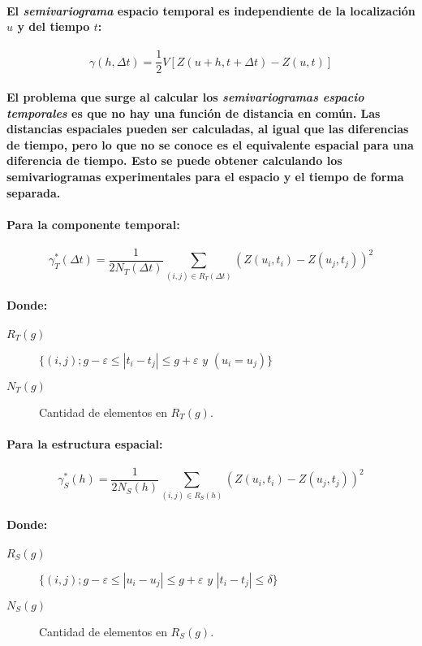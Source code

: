 \paragraph{
El \emph{semivariograma} espacio temporal es independiente de la localización $u$ y del tiempo $t$:
}
\begin{equation}
\gamma(h,\Delta t) = \frac{1}{2}V[Z(u+h,t+\Delta t) -Z(u,t)]
\end{equation}
\paragraph{
El problema que surge al calcular los \emph{semivariogramas espacio temporales} es que no hay una función de distancia en común. Las distancias espaciales pueden ser calculadas, al igual que las diferencias de tiempo, pero lo que no se conoce es el equivalente espacial para una diferencia de tiempo. Esto se puede obtener calculando los semivariogramas experimentales para el espacio y el tiempo de forma separada.
}
\paragraph{
Para la componente temporal:
}
\begin{equation}
\gamma_T^*(\Delta t) = \frac{1}{2 N_T(\Delta t)} \sum_{(i,j) \in R_T(\Delta t)} (Z(u_i,t_i)-Z(u_j,t_j))^2
\end{equation}
\paragraph{
Donde:
}
\begin{description}
\item[$R_T(g)$] $\{ (i,j); g - \varepsilon \leq |t_i - t_j| \leq g + \varepsilon \textit{ y } (u_i = u_j) \}$
\item[$N_T(g)$] Cantidad de elementos en $R_T(g)$.
\end{description}
\paragraph{
Para la estructura espacial:
}
\begin{equation}
\gamma_S^*(h) = \frac{1}{2 N_S(h)} \sum_{(i,j) \in R_S(h)} (Z(u_i,t_i)-Z(u_j,t_j))^2
\end{equation}
\paragraph{
Donde:
}
\begin{description}
\item[$R_S(g)$] $\{ (i,j); g - \varepsilon \leq |u_i - u_j| \leq g + \varepsilon \textit{ y } | t_i - t_j | \leq \delta \}$
\item[$N_S(g)$] Cantidad de elementos en $R_S(g)$.
\end{description}
